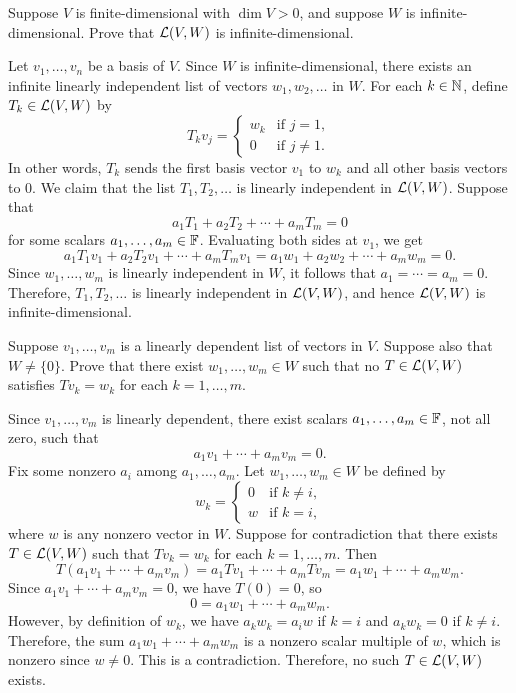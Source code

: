 \begin{exercise}
Suppose $V$ is finite-dimensional with $\dim V>0$, and suppose $W$ is
infinite-dimensional. Prove that $\mathcal{L}(V,W)$ is infinite-dimensional.
\end{exercise}
\begin{solution}
Let $v_1,\dots,v_n$ be a basis of $V$. Since $W$ is infinite-dimensional,
there exists an infinite linearly independent list of vectors
$w_1,w_2,\dots$ in $W$. For each $k\in\mathbb{N}$, define $T_k\in\mathcal{L}(V,W)$ by
\[ T_kv_j=\begin{cases} w_k & \text{if } j=1,\\
   0 & \text{if } j\ne1. \end{cases} \]
In other words, $T_k$ sends the first basis vector $v_1$ to $w_k$ and all
other basis vectors to $0$. We claim that the list $T_1,T_2,\dots$ is linearly
independent in $\mathcal{L}(V,W)$. Suppose that
\[ a_1T_1+a_2T_2+\cdots+a_mT_m=0 \]
for some scalars $a_1,\dots,a_m\in\mathbb{F}$. Evaluating both sides at $v_1$, we get
\[ a_1T_1v_1+a_2T_2v_1+\cdots+a_mT_mv_1=a_1w_1+a_2w_2+\cdots+a_mw_m=0. \]
Since $w_1,\dots,w_m$ is linearly independent in $W$, it follows that
$a_1=\cdots=a_m=0$. Therefore, $T_1,T_2,\dots$ is linearly independent in
$\mathcal{L}(V,W)$, and hence $\mathcal{L}(V,W)$ is infinite-dimensional.
\end{solution}

\begin{exercise}
Suppose $v_1,\dots,v_m$ is a linearly dependent list of vectors in $V$.
Suppose also that $W\ne\{0\}$. Prove that there exist $w_1,\dots,w_m\in W$
such that no $T\in\mathcal{L}(V,W)$ satisfies $Tv_k=w_k$ for each $k=1,\dots,m$.
\end{exercise}
\begin{solution}
Since $v_1,\dots,v_m$ is linearly dependent, there exist scalars
$a_1,\dots,\allowbreak a_m\in\mathbb{F}$, not all zero, such that
\[ a_1v_1+\cdots+a_mv_m=0. \]
Fix some nonzero $a_i$ among $a_1,\dots,a_m$. Let $w_1,\dots,w_m\in W$ be
defined by
\[ w_k=\begin{cases} 0 & \text{if } k\ne i,\\
   w & \text{if } k=i, \end{cases} \]
where $w$ is any nonzero vector in $W$. Suppose for contradiction that there
exists $T\in\mathcal{L}(V,W)$ such that $Tv_k=w_k$ for each $k=1,\dots,m$. Then
\[ T(a_1v_1+\cdots+a_mv_m)=a_1Tv_1+\cdots+a_mTv_m=a_1w_1+\cdots+a_mw_m. \]
Since $a_1v_1+\cdots+a_mv_m=0$, we have $T(0)=0$, so
\[ 0=a_1w_1+\cdots+a_mw_m. \]
However, by definition of $w_k$, we have $a_kw_k=a_iw$ if $k=i$ and
$a_kw_k=0$ if $k\ne i$. Therefore, the sum $a_1w_1+\cdots+a_mw_m$ is a
nonzero scalar multiple of $w$, which is nonzero since $w\ne0$. This is a
contradiction. Therefore, no such $T\in\mathcal{L}(V,W)$ exists.
\end{solution}

